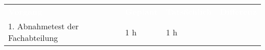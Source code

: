\begin{tabular}{llll}
\rowcolor{heading}\textcolor{white}{\textbf{Vorgang}} & \textcolor{white}{\textbf{Geplant}} & \textcolor{white}{\textbf{Tatsächlich}} & \textcolor{white}{\textbf{Differenz}} \\
1. Abnahmetest der Fachabteilung & 1 h   & 1 h   &  \\
\end{tabular}
